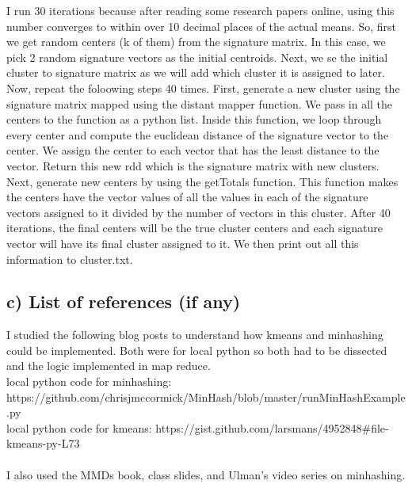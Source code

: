 I run 30 iterations because after reading some research papers online, using this number converges to within over 10 decimal places of the actual means. So, first we get random centers (k of them) from the signature matrix. In this case, we pick 2 random signature vectors as the initial centroids. Next, we se the initial cluster to signature matrix as we will add which cluster it is assigned to later. Now, repeat the foloowing steps 40 times. First, generate a new cluster using the signature matrix mapped using the distant mapper function. We pass in all the centers to the function as a python list. Inside this function, we loop through every center and compute the euclidean distance of the signature vector to the center. We assign the center to each vector that has the least distance to the vector. Return this new rdd which is the signature matrix with new clusters. Next, generate new centers by using the getTotals function. This function makes the centers have the vector values of all the values in each of the signature vectors assigned to it divided by the number of vectors in this cluster. After 40 iterations, the final centers will be the true cluster centers and each signature vector will have its final cluster assigned to it. We then print out all this information to cluster.txt. 

\subsection*{c) List of references (if any)}
I studied the following blog posts to understand how kmeans and minhashing could be implemented. Both were for local python so both had to be dissected and the logic implemented in map reduce.
\\
local python code for minhashing: https://github.com/chrisjmccormick/MinHash/blob/master/runMinHashExample.py
\\
local python code for kmeans: https://gist.github.com/larsmans/4952848\#file-kmeans-py-L73
\\
\\
I also used the MMDs book, class slides, and Ulman's video series on minhashing. 

